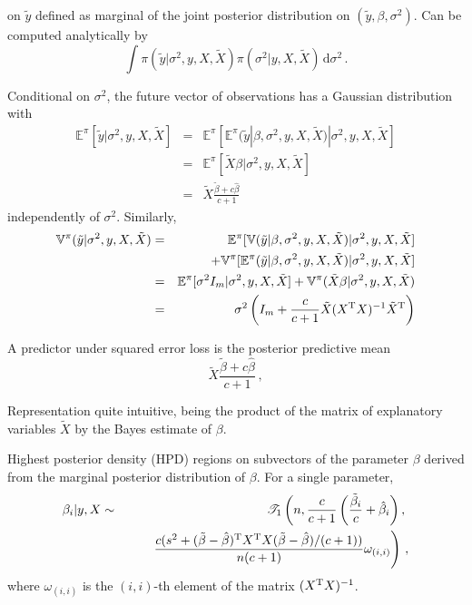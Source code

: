 \begin{slide}
\pause
{} on $\tilde y$ defined as marginal of the joint posterior 
distribution on $(\tilde y,\beta,\sigma^2)$. Can be computed analytically by
$$
\int \pi(\tilde y|\sigma^2,y,X,\tilde X) \pi(\sigma^2|y,X,\tilde X)\,\text{d}\sigma^2\,. 
$$

\end{slide}\begin{slide}
Conditional on $\sigma^2$, the future vector of observations has a Gaussian distribution with
\small
\begin{eqnarray*}
\mathbb{E}^\pi[\tilde y|\sigma^2,y,X,\tilde X] 
& = & \mathbb{E}^\pi[\mathbb{E}^\pi(\tilde y|\beta,\sigma^2,y,X,\tilde X)|\sigma^2,y,X,\tilde X] \\
                                  & = & \mathbb{E}^\pi[\tilde X\beta|\sigma^2,y,X,\tilde X] \\
                                  & = & \tilde X\frac{\tilde\beta+c\hat\beta}{c+1}
\end{eqnarray*}
\normalsize
independently of $\sigma^2$. \pause Similarly,
\small
\begin{eqnarray*}
\mathbb{V}^\pi(\tilde y|\sigma^2,y,X,\tilde X) 
& = & \mathbb{E}^\pi[\mathbb{V}(\tilde y|\beta,\sigma^2,y,X,\tilde X)|\sigma^2,y,X,\tilde X] \\
                  &&\quad +\mathbb{V}^\pi[\mathbb{E}^\pi(\tilde y|\beta,\sigma^2,y,X,\tilde X)|\sigma^2,y,X,\tilde X] \\
                  &=& \mathbb{E}^\pi[\sigma^2I_m|\sigma^2,y,X,\tilde X]+\mathbb{V}^\pi(\tilde X\beta|\sigma^2,y,X,\tilde X) \\
                  &=& \sigma^2\left(I_m+\frac{c}{c+1}\tilde X(X^{\mathrm{T}} X)^{-1}\tilde X^{\mathrm{T}} \right)
\end{eqnarray*}
\normalsize

\end{slide}\begin{slide}

A predictor under squared error loss is the posterior predictive mean
$$
\tilde X\frac{\tilde\beta+c\hat\beta}{c+1}\,,
$$

Representation quite intuitive, 
being the product of the matrix of explanatory variables 
$\tilde X$ by the Bayes estimate of $\beta$.

\end{slide}\begin{slide}
Highest posterior density (HPD) regions on subvectors of the parameter $\beta$ derived 
from the marginal posterior distribution of $\beta$. \pause For a single parameter,
\small
\begin{eqnarray*}
\beta_i|y,X &\sim& \mathscr{T}_1\left(n,\frac{c}{c+1}\left(\frac{\tilde\beta_i}{c}
		+\hat\beta_i\right),\right. \\
            && \qquad \left.\frac{c(s^2+(\tilde\beta-\hat\beta)^{\mathrm{T}} X^{\mathrm{T}} X
		(\tilde\beta-\hat\beta)/(c+1))}{n(c+1)}\omega_{(i,i)}\right)\,,
\end{eqnarray*}
\normalsize
where $\omega_{(i,i)}$ is the $(i,i)$-th element of the matrix $(X^{\mathrm{T}} X)^{-1}$. 


\end{slide}
